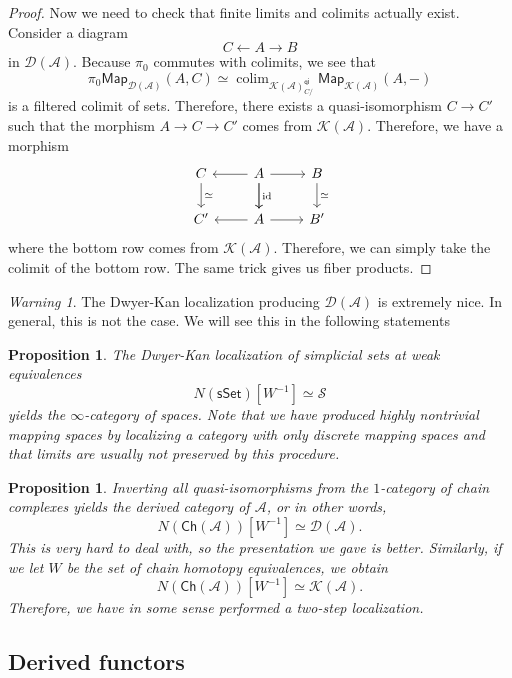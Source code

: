 \documentclass[10pt, oneside]{memoir}
\newtheorem{prop}[thm]{Proposition}
\theoremstyle{definition}
\theoremstyle{remark}
\newtheorem{warn}[thm]{Warning}
\theoremstyle{plain}
\theoremstyle{definition}
\theoremstyle{remark}
\newcommand{\mc}[1]{\mathcal{#1}}
\newcommand{\mr}[1]{\mathrm{#1}}
\newcommand{\ms}[1]{\mathsf{#1}}
\newcommand{\1}{\mathbf{1}}
\newcommand{\2}{\mathbf{2}}
\newcommand{\3}{\mathbf{3}}
\DeclareMathOperator*{\colim}{colim}
\begin{document}
\begin{proof}
    Now we need to check that finite limits and colimits actually exist. Consider a diagram
    \[ C \gets A \to B \]
    in $\mc{D}(\mc{A})$. Because $\pi_0$ commutes with colimits, we see that
    \[ \pi_0 \ms{Map}_{\mc{D}(\mc{A})}(A, C) \simeq \colim_{\mc{K}(\mc{A})_{C/}^{\ms{qi}}} \ms{Map}_{\mc{K}(\mc{A})}(A, -) \]
    is a filtered colimit of sets. Therefore, there exists a quasi-isomorphism $C \to C'$ such that the morphism $A \to C \to C'$ comes from $\mc{K}(\mc{A})$. Therefore, we have a morphism
    \begin{equation*}
    \begin{tikzcd}
        C \ar{d}{\simeq} & A \ar{d}{\mr{id}} \ar{l} \ar{r}\ar{d} & B \ar{d}{\simeq} \\
        C' & A \ar{l} \ar{r} & B'
    \end{tikzcd}
    \end{equation*}
    where the bottom row comes from $\mc{K}(\mc{A})$. Therefore, we can simply take the colimit of the bottom row. The same trick gives us fiber products.
\end{proof}

\begin{warn}
    The Dwyer-Kan localization producing $\mc{D}(\mc{A})$ is extremely nice. In general, this is not the case. We will see this in the following statements
\end{warn}

\begin{prop}
    The Dwyer-Kan localization of simplicial sets at weak equivalences
    \[ N(\ms{sSet})[W^{-1}] \simeq \mc{S} \]
    yields the $\infty$-category of spaces. Note that we have produced highly nontrivial mapping spaces by localizing a category with only discrete mapping spaces and that limits are usually not preserved by this procedure.
\end{prop}

\begin{prop}
    Inverting all quasi-isomorphisms from the $1$-category of chain complexes yields the derived category of $\mc{A}$, or in other words,
    \[ N(\ms{Ch}(\mc{A}))[W^{-1}] \simeq \mc{D}(\mc{A}). \]
    This is very hard to deal with, so the presentation we gave is better. Similarly, if we let $W$ be the set of chain homotopy equivalences, we obtain
    \[ N(\ms{Ch}(\mc{A}))[W^{-1}] \simeq \mc{K}(\mc{A}). \]
    Therefore, we have in some sense performed a two-step localization.
\end{prop}


\subsection{Derived functors}%
\label{sub:Derived functors}
\end{document}
